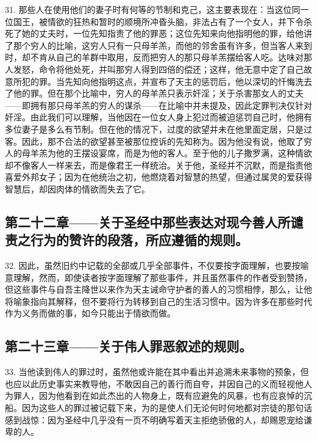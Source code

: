 31. 那些人在使用他们的妻子时有何等的节制和克己，这主要表现在：当这位同一位国王，被情欲的狂热和暂时的顺境所冲昏头脑，非法占有了一个女人，并下令杀死了她的丈夫时，一位先知指责了他的罪恶；这位先知来向他指明他的罪，给他讲了那个穷人的比喻，这穷人只有一只母羊羔，而他的邻舍虽有许多，但当客人来到时，却不肯从自己的羊群中取用，反而把穷人的那只母羊羔摆给客人吃。达味对那人发怒，命令将他处死，并叫那穷人得到四倍的偿还；这样，他无意中定了自己故意所犯的罪。当先知向他指明这点，并宣布了天主的惩罚后，他以深切的忏悔洗去了他的罪。但在那个比喻中，穷人的母羊羔只表示奸淫；关于杀害那女人的丈夫——即拥有那只母羊羔的穷人的谋杀——在比喻中并未提及，因此定罪判决仅针对奸淫。由此我们可以理解，当他因在一位女人身上犯过而被迫惩罚自己时，他拥有多位妻子是多么有节制。但在他的情况下，过度的欲望并未在他里面定居，只是过客。因此，那不合法的欲望甚至被那位控诉的先知称为。因为他没有说，他取了穷人的母羊羔为他的王摆设宴席，而是为他的客人。至于他的儿子撒罗满，这种情欲却不像客人一样来去，而是像君王一样统治。关于他，圣经并不沉默，而是指责他喜爱外邦女子；因为在他统治之初，他燃烧着对智慧的热望，但通过属灵的爱获得智慧后，却因肉体的情欲而失去了它。\par


\subsection{第二十二章——关于圣经中那些表达对现今善人所谴责之行为的赞许的段落，所应遵循的规则。}

32. 因此，虽然旧约中记载的全部或几乎全部事件，不仅要按字面理解，也要按喻意理解，然而，即使读者按字面理解了那些事件，并且虽然事件的作者受到赞扬，但这些事件与自吾主降世以来作为天主诫命守护者的善人的习惯相悖，那么，让他将喻象指向其解释，但不要将行为转移到自己的生活习惯中。因为许多在那些时代作为义务而做的事，如今只能出于情欲而做。\par


\subsection{第二十三章——关于伟人罪恶叙述的规则。}

33. 当他读到伟人的罪过时，虽然他或许能在其中看出并追溯未来事物的预象，但也应以此历史事实来教导他，不敢因自己的善行而自夸，并因自己的义而轻视他人为罪人，因为他看到在如此杰出的人物身上，既有应避免的风暴，也有应哀悼的沉船。因为这些人的罪过被记载下来，为的是使人们无论何时何地都对宗徒的那句话感到战惊：因为圣经中几乎没有一页不明确写着天主拒绝骄傲的人，却赐恩宠给谦卑的人。\par

